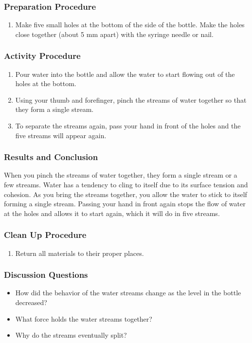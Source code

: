 \subsubsection*{Preparation Procedure}
\begin{enumerate}
\item{Make five small holes at the bottom of the side of the bottle. Make the holes close together (about 5 mm apart) with the syringe needle or nail.}
\end{enumerate}

\subsubsection*{Activity Procedure}
\begin{enumerate}
\item{Pour water into the bottle and allow the water to start flowing out of the holes at the bottom.}
\item{Using your thumb and forefinger, pinch the streams of water together so that they form a single stream.}
\item{To separate the streams again, pass your hand in front of the holes and the five streams will appear again.}
\end{enumerate}

\subsubsection*{Results and Conclusion}
When you pinch the streams of water together, they form a single stream or a few streams. Water has a tendency to cling to itself due to its surface tension and cohesion. As you bring the streams together, you allow the water to stick to itself forming a single stream. Passing your hand in front again stops the flow of water at the holes and allows it to start again, which it will do in five streams.

\subsubsection*{Clean Up Procedure}
\begin{enumerate}
\item{Return all materials to their proper places.}
\end{enumerate}

\subsubsection*{Discussion Questions}
\begin{itemize}
\item{How did the behavior of the water streams change as the level in the bottle decreased?}
\item{What force holds the water streams together?}
\item{Why do the streams eventually split?}
\end{itemize}

